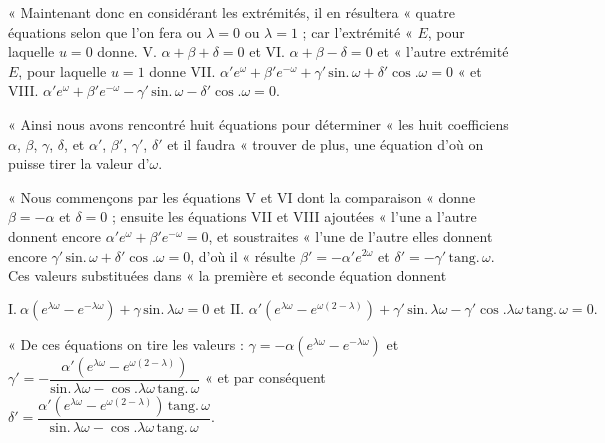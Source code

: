\documentclass[11pt,a4paper]{article}
\begin{document}
« Maintenant donc en considérant les extrémités, il en résultera « quatre
équations selon que l'on fera ou $\lambda=0$ ou $\lambda=1$ ; car l'extrémité
« $E$, pour laquelle $u=0$ donne. V. $\alpha+\beta+\delta=0$ et VI.
$\alpha+\beta-\delta=0$ et « l'autre extrémité $E$, pour laquelle $u=1$ donne
VII. $\alpha' e^{\omega}+\beta' e^{-\omega}+\gamma'\,\text{sin.}\,\omega+\delta'\cos.\omega=0$
« et VIII. $\alpha' e^{\omega}+\beta' e^{-\omega}-\gamma'\,\text{sin.}\,\omega-\delta'\cos.\omega=0$.

« Ainsi nous avons rencontré huit équations pour déterminer « les huit
coefficiens $\alpha$, $\beta$, $\gamma$, $\delta$, et $\alpha'$, $\beta'$,
$\gamma'$, $\delta'$ et il faudra « trouver de plus, une équation d'où on
puisse tirer la valeur d'$\omega$.

« Nous commençons par les équations V et VI dont la comparaison « donne
$\beta=-\alpha$ et $\delta=0$ ; ensuite les équations VII et VIII ajoutées
« l'une a l'autre donnent encore $\alpha' e^{\omega}+\beta' e^{-\omega}=0$,
et soustraites « l'une de l'autre elles donnent encore
$\gamma'\,\text{sin.}\,\omega+\delta'\cos.\omega=0$, d'où il « résulte
$\beta'=-\alpha' e^{2\omega}$ et $\delta'=-\gamma'\,\text{tang.}\,\omega$.
Ces valeurs substituées dans « la première et seconde équation donnent

\[ \text{I.}\ \alpha(e^{\lambda\omega}-e^{-\lambda\omega})+\gamma\,\text{sin.}\,\lambda\omega=0 \text{ et II. } \alpha'(e^{\lambda\omega}-e^{\omega(2-\lambda)})+\gamma'\,\text{sin.}\,\lambda\omega-\gamma'\cos.\lambda\omega\,\text{tang.}\,\omega=0. \]

« De ces équations on tire les valeurs :
$\gamma=-\alpha(e^{\lambda\omega}-e^{-\lambda\omega})$ et
$\gamma'=-\dfrac{\alpha'(e^{\lambda\omega}-e^{\omega(2-\lambda)})}{\text{sin.}\,\lambda\omega-\cos.\lambda\omega\,\text{tang.}\,\omega}$
« et par conséquent
$\delta'=\dfrac{\alpha'(e^{\lambda\omega}-e^{\omega(2-\lambda)})\,\text{tang.}\,\omega}{\text{sin.}\,\lambda\omega-\cos.\lambda\omega\,\text{tang.}\,\omega}$.
\end{document}
